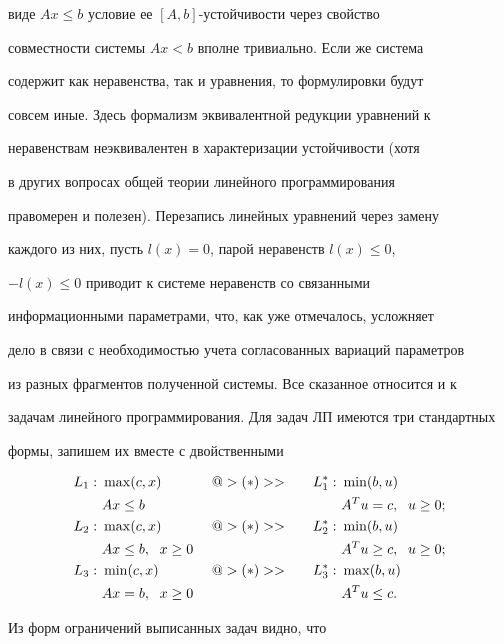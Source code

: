виде $Ax\leq b$ условие ее $[A,b]$-устойчивости через свойство


совместности системы $Ax<b$ вполне тривиально. Если же система


содержит как неравенства, так и уравнения, то формулировки будут


совсем иные. Здесь формализм эквивалентной редукции уравнений к


неравенствам неэквивалентен в характеризации устойчивости (хотя


в других вопросах общей теории линейного программирования


правомерен и полезен). Перезапись линейных уравнений через замену


каждого из них, пусть $l(x)=0$, парой неравенств $l(x)\leq 0$,


$-l(x)\leq 0$ приводит к системе неравенств со связанными


информационными параметрами, что, как уже отмечалось, усложняет


дело в связи с необходимостью учета согласованных вариаций параметров


из разных фрагментов полученной системы. Все сказанное относится и к


задачам линейного программирования. Для задач ЛП имеются три стандартных


формы, запишем их вместе с двойственными


\begin{alignat}{3}


L_1:\ &\max(c,x) &\ &{@>(*)>>} &\quad L_1^*:\ &\min(b,u)\\


&Ax\leq b &\ &\ &\quad &A^Tu=c,\ \; u\geq 0;\notag\\


L_2:\ &\max(c,x) &\ &{@>(*)>>} &\quad L_2^*:\ &\min(b,u)\\


&Ax\leq b,\ \; x\geq 0 &\ &\ &\quad


&A^Tu\geq c,\ \; u\geq 0;\notag\\


L_3:\ &\min(c,x) &\ &{@>(*)>>} &\quad L_3^*:\ &\max(b,u)\\


&Ax=b,\ \; x\geq 0 &\ &\ &\quad &A^Tu\leq c.\notag


\end{alignat}


Из форм ограничений выписанных задач видно, что



